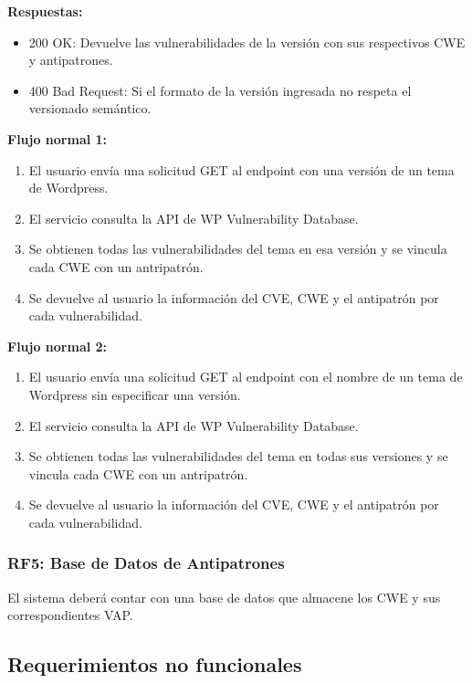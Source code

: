 \textbf{Respuestas:}

\begin{itemize}
    \item 200 OK: Devuelve las vulnerabilidades de la versión con sus respectivos CWE y antipatrones.
    \item 400 Bad Request: Si el formato de la versión ingresada no respeta el versionado semántico.
\end{itemize}

\textbf{Flujo normal 1:}

\begin{enumerate}
    \item El usuario envía una solicitud GET al endpoint con una versión de un tema de Wordpress.
    \item El servicio consulta la API de WP Vulnerability Database.
    \item Se obtienen todas las vulnerabilidades del tema en esa versión y se vincula cada CWE con un antripatrón.
    \item Se devuelve al usuario la información del CVE, CWE y el antipatrón por cada vulnerabilidad.
\end{enumerate}

\textbf{Flujo normal 2:}

\begin{enumerate}
    \item El usuario envía una solicitud GET al endpoint con el nombre de un tema de Wordpress sin especificar una versión.
    \item El servicio consulta la API de WP Vulnerability Database.
    \item Se obtienen todas las vulnerabilidades del tema en todas sus versiones y se vincula cada CWE con un antripatrón.
    \item Se devuelve al usuario la información del CVE, CWE y el antipatrón por cada vulnerabilidad.
\end{enumerate}

\subsubsection{RF5: Base de Datos de Antipatrones}

El sistema deberá contar con una base de datos que almacene los CWE y sus correspondientes VAP.

\subsection{Requerimientos no funcionales}

